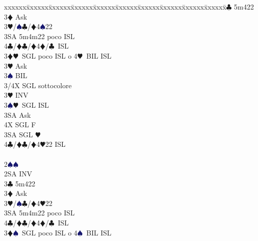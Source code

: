 \documentclass[a4paper,italian]{article}
\newcommand{\BC}{\textcolor{OliveGreen}{$\clubsuit$}}
\newcommand{\BD}{\textcolor{RedOrange}{$\vardiamondsuit$}}
\newcommand{\BH}{\textcolor{Red2}{$\varheartsuit${}}}
\newcommand{\BS}{\textcolor{MidnightBlue}{$\spadesuit${}}}
\newenvironment{bidtable}
{\begin{tabbing}

    xxxxxx\=xxxxxx\=xxxxxx\=xxxxxx\=xxxxxx\=xxxxxx\=xxxxxx\=xxxxxx\=xxxxxx\=xxxxxx\=\kill}
{\end{tabbing} }%
\begin{document}
\begin{multicols}{2}
\begin{bidtable}
                                            3\BC \> 5m422\+\\
                                            3\BD \> Ask\+\\
                                            3\BH/\BS {}\BC /\BD 4\BS 22\\
                                            3SA \> 5m4m22 poco ISL\\
                                            4\BC/\BD {}\BC /\BD 4\BD /\BC\ ISL\-\-\\
                                            3\BD {}\BH\ SGL poco ISL o 4\BH\ BIL ISL\+\\
                                            3\BH \> Ask\+\\
                                            3\BS \> BIL\\
                                            3/4X \> SGL sottocolore\-\-\\
                                            3\BH \> INV\\
                                            3\BS {}\BH\ SGL ISL\+\\
                                            3SA \> Ask\+\\
                                            4X \> SGL F\-\-\\
                                            3SA \> SGL \BH \\
                                            4\BC/\BD {}\BC /\BD 4\BH 22 ISL\-\\
                                            \\
                                            2\BS {}\BS \+\\
                                            2SA \> INV\\
                                            3\BC \> 5m422\+\\
                                            3\BD \> Ask\+\\
                                            3\BH/\BS {}\BC /\BD 4\BH 22\\
                                            3SA \> 5m4m22 poco ISL\\
                                            4\BC/\BD {}\BC /\BD 4\BD /\BC\ ISL\-\-\\
                                            3\BD {}\BS\ SGL poco ISL o 4\BS\ BIL ISL\+\\

\end{bidtable}
\end{multicols}
\end{document}
